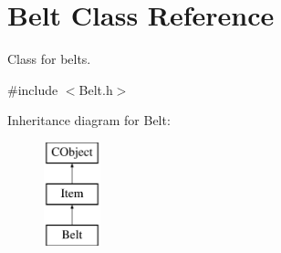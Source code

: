 \hypertarget{class_belt}{}\section{Belt Class Reference}
\label{class_belt}


Class for belts.  




{\ttfamily \#include $<$Belt.\+h$>$}

Inheritance diagram for Belt\+:\begin{figure}[H]
\begin{center}
\leavevmode
\includegraphics[height=3.000000cm]{class_belt}
\end{center}
\end{figure}
